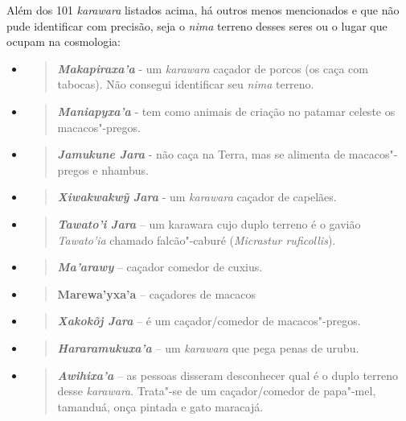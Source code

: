 Além dos 101 \emph{karawara} listados acima, há outros menos mencionados
e que não pude identificar com precisão, seja o \emph{nima} terreno
desses seres ou o lugar que ocupam na cosmologia:

\begin{itemize}
\item
  \begin{quote}
  \emph{\textbf{Makapiraxa'a}} - um \emph{karawara} caçador de porcos
  (os caça com tabocas). Não consegui identificar seu \emph{nima}
  terreno.
  \end{quote}
\item
  \begin{quote}
  \emph{\textbf{Maniapyxa'a}} - tem como animais de criação no patamar
  celeste os macacos"-pregos.
  \end{quote}
\item
  \begin{quote}
  \emph{\textbf{Jamukune Jara}} - não caça na Terra, mas se alimenta de
  macacos"-pregos e nhambus.
  \end{quote}
\item
  \begin{quote}
  \textbf{\emph{Xiwakwakwỹ} \emph{Jara}} - um \emph{karawara} caçador de
  capelães.
  \end{quote}
\item
  \begin{quote}
  \textbf{\emph{Tawato'i} \emph{Jara}} -- um karawara cujo duplo terreno
  é o gavião \emph{Tawato'ia} chamado falcão"-caburé (\emph{Micrastur
  ruficollis}).
  \end{quote}
\item
  \begin{quote}
  \emph{\textbf{Ma'arawy}} -- caçador comedor de cuxius.
  \end{quote}
\item
  \begin{quote}
  \textbf{Marewa'yxa'a} -- caçadores de macacos 
  \end{quote}
\item
  \begin{quote}
  \textbf{\emph{Xakokõj Jara}} -- é um caçador/comedor de
  macacos"-pregos.
  \end{quote}
\item
  \begin{quote}
  \emph{\textbf{Hararamukuxa'a}} -- um \emph{karawara} que pega penas de
  urubu.
  \end{quote}
\item
  \begin{quote}
  \emph{\textbf{Awihixa'a}} -- as pessoas disseram desconhecer qual é o
  duplo terreno desse \emph{karawara}. Trata"-se de um caçador/comedor de
  papa"-mel, tamanduá, onça pintada e gato maracajá.
  \end{quote}
\end{itemize}

